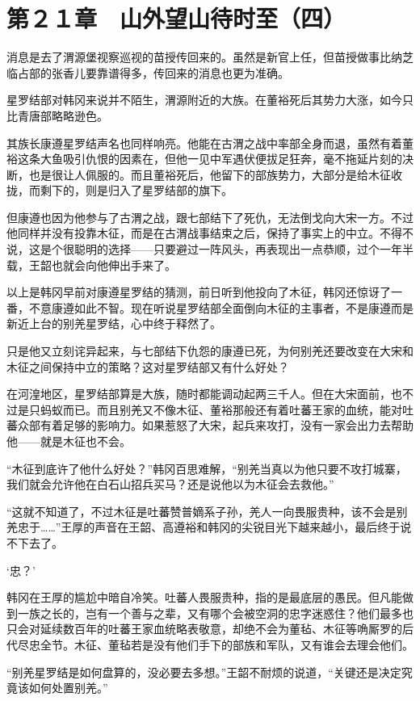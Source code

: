 \section{第２１章　山外望山待时至（四）}

消息是去了渭源堡视察巡视的苗授传回来的。虽然是新官上任，但苗授做事比纳芝临占部的张香儿要靠谱得多，传回来的消息也更为准确。

星罗结部对韩冈来说并不陌生，渭源附近的大族。在董裕死后其势力大涨，如今只比青唐部略略逊色。

其族长康遵星罗结声名也同样响亮。他能在古渭之战中率部全身而退，虽然有着董裕这条大鱼吸引仇恨的因素在，但他一见中军遇伏便拔足狂奔，毫不拖延片刻的决断，也是很让人佩服的。而且董裕死后，他留下的部族势力，大部分是给木征收拢，而剩下的，则是归入了星罗结部的旗下。

但康遵也因为他参与了古渭之战，跟七部结下了死仇，无法倒戈向大宋一方。不过他同样并没有投靠木征，而是在古渭战事结束之后，保持了事实上的中立。不得不说，这是个很聪明的选择——只要避过一阵风头，再表现出一点恭顺，过个一年半载，王韶也就会向他伸出手来了。

以上是韩冈早前对康遵星罗结的猜测，前日听到他投向了木征，韩冈还惊讶了一番，不意康遵如此不智。现在听说星罗结部全面倒向木征的主事者，不是康遵而是新近上台的别羌星罗结，心中终于释然了。

只是他又立刻诧异起来，与七部结下仇怨的康遵已死，为何别羌还要改变在大宋和木征之间保持中立的策略？这对星罗结部又有什么好处？

在河湟地区，星罗结部算是大族，随时都能调动起两三千人。但在大宋面前，也不过是只蚂蚁而已。而且别羌又不像木征、董裕那般还有着吐蕃王家的血统，能对吐蕃众部有着足够的影响力。如果惹怒了大宋，起兵来攻打，没有一家会出力去帮助他——就是木征也不会。

“木征到底许了他什么好处？”韩冈百思难解，“别羌当真以为他只要不攻打城寨，我们就会允许他在白石山招兵买马？还是说他以为木征会去救他。”

“这就不知道了，不过木征是吐蕃赞普嫡系子孙，羌人一向畏服贵种，该不会是别羌忠于……”王厚的声音在王韶、高遵裕和韩冈的尖锐目光下越来越小，最后终于说不下去了。

‘忠？’

韩冈在王厚的尴尬中暗自冷笑。吐蕃人畏服贵种，指的是最底层的愚民。但凡能做到一族之长的，岂有一个善与之辈，又有哪个会被空洞的忠字迷惑住？他们最多也只会对延续数百年的吐蕃王家血统略表敬意，却绝不会为董毡、木征等唃厮罗的后代尽忠全节。木征、董毡若是没有他们手下的部族和军队，又有谁会去理会他们。

“别羌星罗结是如何盘算的，没必要去多想。”王韶不耐烦的说道，“关键还是决定究竟该如何处置别羌。”

